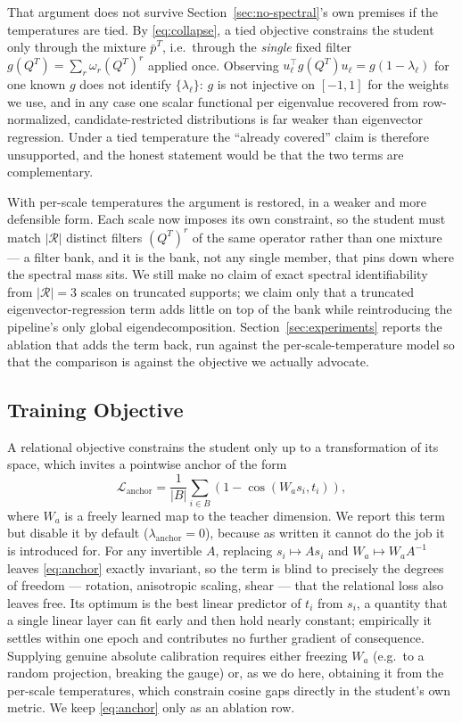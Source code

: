 That argument does not survive Section~\ref{sec:no-spectral}'s own premises if the temperatures are tied. By \eqref{eq:collapse}, a tied objective constrains the student only through the mixture $\bar p^T$, i.e.\ through the \emph{single} fixed filter $g(Q^T)=\sum_r\omega_r (Q^T)^r$ applied once. Observing $u_\ell^\top g(Q^T) u_\ell = g(1-\lambda_\ell)$ for one known $g$ does not identify $\{\lambda_\ell\}$: $g$ is not injective on $[-1,1]$ for the weights we use, and in any case one scalar functional per eigenvalue recovered from row-normalized, candidate-restricted distributions is far weaker than eigenvector regression. Under a tied temperature the ``already covered'' claim is therefore unsupported, and the honest statement would be that the two terms are complementary.

With per-scale temperatures the argument is restored, in a weaker and more defensible form. Each scale now imposes its own constraint, so the student must match $|\mathcal{R}|$ distinct filters $(Q^T)^r$ of the same operator rather than one mixture --- a filter bank, and it is the bank, not any single member, that pins down where the spectral mass sits. We still make no claim of exact spectral identifiability from $|\mathcal{R}|=3$ scales on truncated supports; we claim only that a truncated eigenvector-regression term adds little on top of the bank while reintroducing the pipeline's only global eigendecomposition. Section~\ref{sec:experiments} reports the ablation that adds the term back, run against the per-scale-temperature model so that the comparison is against the objective we actually advocate.

\subsection{Training Objective}
\label{sec:objective}

A relational objective constrains the student only up to a transformation of its space, which invites a pointwise anchor of the form
\begin{equation}
    \mathcal{L}_{\mathrm{anchor}}
    =
    \frac{1}{|B|}
    \sum_{i\in B}
    \left(1-\cos(W_a s_i,t_i)\right),
    \label{eq:anchor}
\end{equation}
where $W_a$ is a freely learned map to the teacher dimension. We report this term but disable it by default ($\lambda_{\mathrm{anchor}}=0$), because as written it cannot do the job it is introduced for. For any invertible $A$, replacing $s_i\mapsto As_i$ and $W_a\mapsto W_aA^{-1}$ leaves \eqref{eq:anchor} exactly invariant, so the term is blind to precisely the degrees of freedom --- rotation, anisotropic scaling, shear --- that the relational loss also leaves free. Its optimum is the best linear predictor of $t_i$ from $s_i$, a quantity that a single linear layer can fit early and then hold nearly constant; empirically it settles within one epoch and contributes no further gradient of consequence. Supplying genuine absolute calibration requires either freezing $W_a$ (e.g.\ to a random projection, breaking the gauge) or, as we do here, obtaining it from the per-scale temperatures, which constrain cosine gaps directly in the student's own metric. We keep \eqref{eq:anchor} only as an ablation row.

